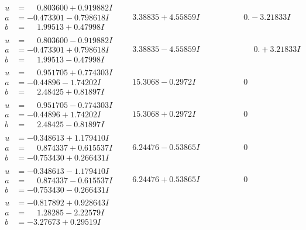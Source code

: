 \documentclass[1p]{elsarticle_modified}
\theoremstyle{definition}
\begin{document}
$$\begin{array}{c|c|c}
\begin{aligned}
u &= \phantom{-}0.803600 + 0.919882 I \\
a &= -0.473301 - 0.798618 I \\
b &= \phantom{-}1.99513 + 0.47998 I\end{aligned}
 & \phantom{-}3.38835 + 4.55859 I & \phantom{-0.000000 } 0. - 3.21833 I \\ \hline\begin{aligned}
u &= \phantom{-}0.803600 - 0.919882 I \\
a &= -0.473301 + 0.798618 I \\
b &= \phantom{-}1.99513 - 0.47998 I\end{aligned}
 & \phantom{-}3.38835 - 4.55859 I & \phantom{-0.000000 -}0. + 3.21833 I \\ \hline\begin{aligned}
u &= \phantom{-}0.951705 + 0.774303 I \\
a &= -0.44896 - 1.74202 I \\
b &= \phantom{-}2.48425 + 0.81897 I\end{aligned}
 & \phantom{-}15.3068 - 0.2972 I & \phantom{-0.000000 } 0 \\ \hline\begin{aligned}
u &= \phantom{-}0.951705 - 0.774303 I \\
a &= -0.44896 + 1.74202 I \\
b &= \phantom{-}2.48425 - 0.81897 I\end{aligned}
 & \phantom{-}15.3068 + 0.2972 I & \phantom{-0.000000 } 0 \\ \hline\begin{aligned}
u &= -0.348613 + 1.179410 I \\
a &= \phantom{-}0.874337 + 0.615537 I \\
b &= -0.753430 + 0.266431 I\end{aligned}
 & \phantom{-}6.24476 - 0.53865 I & \phantom{-0.000000 } 0 \\ \hline\begin{aligned}
u &= -0.348613 - 1.179410 I \\
a &= \phantom{-}0.874337 - 0.615537 I \\
b &= -0.753430 - 0.266431 I\end{aligned}
 & \phantom{-}6.24476 + 0.53865 I & \phantom{-0.000000 } 0 \\ \hline\begin{aligned}
u &= -0.817892 + 0.928643 I \\
a &= \phantom{-}1.28285 - 2.22579 I \\
b &= -3.27673 + 0.29519 I\end{aligned}

\end{array}$$
\end{document}
